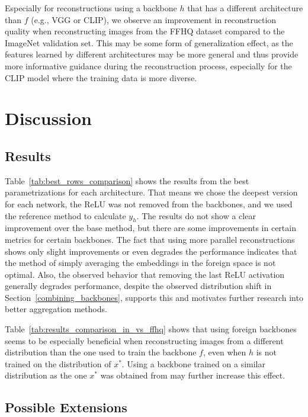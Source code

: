 \documentclass[10pt,twocolumn]{article}
\begin{document}
Especially for reconstructions using a backbone $h$ that has a different architecture than $f$ (e.g., VGG or CLIP), we observe an improvement in reconstruction quality when reconstructing images from the FFHQ dataset compared to the ImageNet validation set.
This may be some form of generalization effect, as the features learned by different architectures may be more general and thus provide more informative guidance during the reconstruction process, especially for the CLIP model where the training data is more diverse.
\section{Discussion}
\subsection{Results}
Table~\ref{tab:best_rows_comparison} shows the results from the best parametrizations for each architecture.
That means we chose the deepest version for each network, the ReLU was not removed from the backbones, and we used the reference method to calculate $y_h$.
The results do not show a clear improvement over the base method, but there are some improvements in certain metrics for certain backbones.
The fact that using more parallel reconstructions shows only slight improvements or even degrades the performance indicates that the method of simply averaging the embeddings in the foreign space is not optimal.
Also, the observed behavior that removing the last ReLU activation generally degrades performance, despite the observed distribution shift in Section~\ref{combining_backbones}, supports this and motivates further research into better aggregation methods.

Table~\ref{tab:results_comparison_in_vs_ffhq} shows that using foreign backbones seems to be especially beneficial when reconstructing images from a different distribution than the one used to train the backbone $f$, even when $h$ is not trained on the distribution of $x^*$.
Using a backbone trained on a similar distribution as the one $x^*$ was obtained from may further increase this effect.

\subsection{Possible Extensions}
\end{document}
